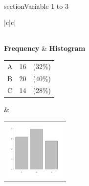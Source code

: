 


 \\section{Variable 1 to 3} 
  \begin{center}
    \addtolength{\leftskip}{-4cm}\addtolength{\rightskip}{-4cm}
    \begin{tabular}{|c|c|}

      \hline
        \\
      \hline
        {\bf Frequency} & {\bf Histogram}  \\
          \begin{tabular}{@{}l@{ : }cl@{}}
            A & 16 &(32\%) \\
            B & 20 &(40\%) \\
            C & 14 &(28\%) \\
          \end{tabular}
      &
          \begin{tabular}{@{}l@{}}
            \includegraphics[width=3cm]{graphUniv/V1-barplot}
          \end{tabular}
      \\ \hline 

    \end{tabular}
  \end{center}
  
  
